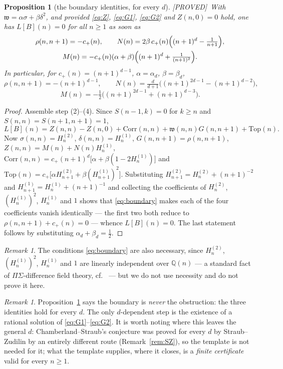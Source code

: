 \documentclass[11pt,reqno]{amsart}
\theoremstyle{plain}
\newtheorem{proposition}[theorem]{Proposition}
\theoremstyle{definition}
\theoremstyle{remark}
\newtheorem{remark}[theorem]{Remark}
\newcommand{\Q}{\mathbb{Q}}
\newcommand{\HH}[2]{H^{(#1)}_{#2}}
\newcommand{\Proved}{\textup{\textsf{[PROVED]}}}
\numberwithin{equation}{section}
\begin{document}
\begin{proposition}[the boundary identities, for every $d$]\label{prop:boundary}
\Proved\ With $\mathfrak w=\alpha\sigma+\beta\delta^2$, and provided \eqref{eq:Z},
\eqref{eq:G1}, \eqref{eq:G2} and $Z(n,0)=0$ hold, one has $L[B](n)=0$ for all $n\ge1$
as soon as
\begin{equation}\label{eq:boundary}
\begin{gathered}
  \rho(n,n+1)=-c_+(n),\qquad
  N(n)=2\beta\,c_+(n)\Bigl((n+1)^d-\tfrac1{n+1}\Bigr),\\
  M(n)=-c_+(n)(\alpha+\beta)\Bigl((n+1)^d+\tfrac1{(n+1)^2}\Bigr).
\end{gathered}
\end{equation}
In particular, for $c_+(n)=(n+1)^{d-1}$, $\alpha=\alpha_d$, $\beta=\beta_d$,
\[
  \rho(n,n+1)=-(n+1)^{d-1},\qquad
  N(n)=\tfrac{d}{d+1}\bigl((n+1)^{2d-1}-(n+1)^{d-2}\bigr),
\]
\[
  M(n)=-\tfrac12\bigl((n+1)^{2d-1}+(n+1)^{d-3}\bigr).
\]
\end{proposition}

\begin{proof}
Assemble step (2)--(4). Since $S(n-1,k)=0$ for $k\ge n$ and $S(n,n)=S(n+1,n+1)=1$,
\[
  L[B](n)=Z(n,n)-Z(n,0)+\mathrm{Corr}(n,n)+\mathfrak w(n,n)G(n,n+1)+\mathrm{Top}(n).
\]
Now $\sigma(n,n)=\HH2n$, $\delta(n,n)=\HH1n$, $G(n,n+1)=\rho(n,n+1)$,
$Z(n,n)=M(n)+N(n)\HH1n$, $\mathrm{Corr}(n,n)=c_+(n+1)^d\bigl[\alpha+\beta(1-2\HH1n)\bigr]$
and $\mathrm{Top}(n)=c_+\bigl[\alpha\HH2{n+1}+\beta(\HH1{n+1})^2\bigr]$. Substituting
$\HH2{n+1}=\HH2n+(n+1)^{-2}$ and $\HH1{n+1}=\HH1n+(n+1)^{-1}$ and collecting the
coefficients of $\HH2n$, $(\HH1n)^2$, $\HH1n$ and $1$ shows that \eqref{eq:boundary} makes
each of the four coefficients vanish identically --- the first two both reduce to
$\rho(n,n+1)+c_+(n)=0$ --- whence $L[B](n)=0$. The last statement follows by substituting
$\alpha_d+\beta_d=\tfrac12$.
\end{proof}

\begin{remark}
The conditions \eqref{eq:boundary} are also necessary, since $\HH2n$, $(\HH1n)^2$, $\HH1n$
and $1$ are linearly independent over $\Q(n)$ --- a standard fact of $\Pi\Sigma$-difference
field theory, cf.\ \cite{Schneider2007} --- but we do not use necessity and do not prove it
here.
\end{remark}

\begin{remark}
Proposition~\ref{prop:boundary} says the boundary is \emph{never} the obstruction: the three
identities hold for every $d$. The only $d$-dependent step is the existence of a rational
solution of \eqref{eq:G1}--\eqref{eq:G2}. It is worth noting where this leaves the general
$d$: Chamberland--Straub's conjecture \cite[Conj.~9]{ChamStraub} was proved for every $d$ by
Straub--Zudilin \cite{StraubZudilin} by an entirely different route (Remark~\ref{rem:SZ}),
so the template is not needed for it; what the template supplies, where it closes, is a
\emph{finite certificate} valid for every $n\ge1$.
\end{remark}
\end{document}
